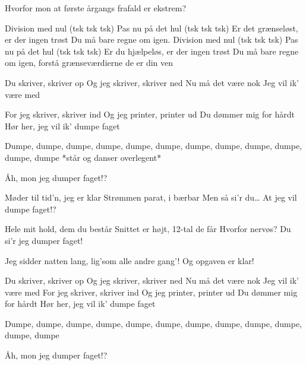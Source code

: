 \documentclass[a4paper,11pt]{article}
\begin{document}
\begin{song}
 Hvorfor mon at første årgangs frafald er ekstrem?


 Division med nul (tsk tsk tsk) 
Pas nu på det hul (tsk tsk tsk) 
Er det grænseløst, er der ingen trøst 
Du må bare regne om igen. 
Division med nul (tsk tsk tsk) 
Pas nu på det hul (tsk tsk tsk) 
Er du hjælpeløs, er der ingen trøst 
Du må bare regne om igen, 
forstå grænseværdierne de er din ven


 Du skriver, skriver op 
Og jeg skriver, skriver ned 
Nu må det være nok 
Jeg vil ik’ være med 

For jeg skriver, skriver ind 
Og jeg printer, printer ud 
Du dømmer mig for hårdt 
Hør her, jeg vil ik’ dumpe faget


 Dumpe, dumpe, dumpe, dumpe, dumpe, dumpe, dumpe, dumpe, dumpe, dumpe, dumpe, dumpe *står og danser overlegent*

 Åh, mon jeg dumper faget!? 

Møder til tid’n, jeg er klar 
Strømmen parat, i bærbar 
Men så si’r du… At jeg vil dumpe faget!? 

Hele mit hold, dem du består 
Snittet er højt, 12-tal de får 
Hvorfor nervøs? 
Du si’r jeg dumper faget! 

Jeg sidder natten lang, lig’som alle andre gang’! 
Og opgaven er klar!

 Du skriver, skriver op 
Og jeg skriver, skriver ned 
Nu må det være nok 
Jeg vil ik’ være med 
For jeg skriver, skriver ind 
Og jeg printer, printer ud 
Du dømmer mig for hårdt 
Hør her, jeg vil ik’ dumpe faget

 Dumpe, dumpe, dumpe, dumpe, dumpe, dumpe, dumpe, dumpe, dumpe, dumpe, dumpe, dumpe 

 Åh, mon jeg dumper faget!? 

\end{song}
\end{document}
